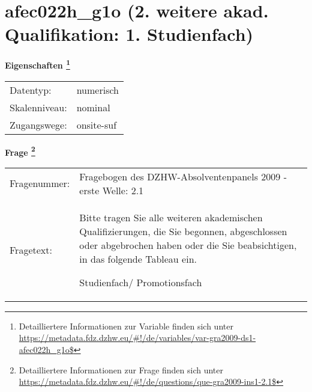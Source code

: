 
    \setcounter{footnote}{0}

    \vspace*{-1.8cm}
	\section{afec022h\_g1o (2. weitere akad. Qualifikation: 1. Studienfach)}
	\label{section:afec022h_g1o}



    \vspace*{0.5cm}
    \noindent\textbf{Eigenschaften
	\footnote{Detailliertere Informationen zur Variable finden sich unter
		\url{https://metadata.fdz.dzhw.eu/\#!/de/variables/var-gra2009-ds1-afec022h_g1o$}}}\\
	\begin{tabularx}{\hsize}{@{}lX}
	Datentyp: & numerisch \\
	Skalenniveau: & nominal \\
	Zugangswege: &
	  onsite-suf
 \\
    \end{tabularx}



				\vspace*{0.5cm}
                \noindent\textbf{Frage
	                \footnote{Detailliertere Informationen zur Frage finden sich unter
		              \url{https://metadata.fdz.dzhw.eu/\#!/de/questions/que-gra2009-ins1-2.1$}}}\\
				\begin{tabularx}{\hsize}{@{}lX}
					Fragenummer: &
					  Fragebogen des DZHW-Absolventenpanels 2009 - erste Welle:
					  2.1
 \\
					Fragetext: & Bitte tragen Sie alle weiteren akademischen Qualifizierungen, die Sie begonnen, abgeschlossen oder abgebrochen haben oder die Sie beabsichtigen, in das folgende Tableau ein.\par  Studienfach/ Promotionsfach \\
				\end{tabularx}





